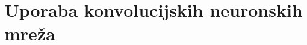 
\chapter{Uporaba konvolucijskih neuronskih mreža}\label{ch:uporaba-konvolucijskih-neuronskih-mreza}